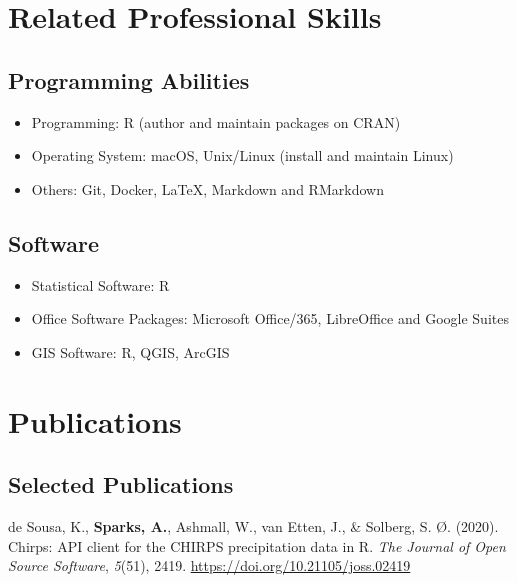 \documentclass[11pt, a4paper]{awesome-cv}
\providecommand{\tightlist}{%
	\setlength{\itemsep}{0pt}\setlength{\parskip}{0pt}}
\begin{document}
\hypertarget{related-professional-skills}{%
\section{Related Professional
Skills}\label{related-professional-skills}}

\hypertarget{programming-abilities}{%
\subsection{Programming Abilities}\label{programming-abilities}}

\begin{itemize}
\tightlist
\item
  Programming: R (author and maintain packages on CRAN)
\item
  Operating System: macOS, Unix/Linux (install and maintain Linux)
\item
  Others: Git, Docker, LaTeX, Markdown and RMarkdown
\end{itemize}

\hypertarget{software}{%
\subsection{Software}\label{software}}

\begin{itemize}
\tightlist
\item
  Statistical Software: R
\item
  Office Software Packages: Microsoft Office/365, LibreOffice and Google
  Suites
\item
  GIS Software: R, QGIS, ArcGIS
\end{itemize}

\hypertarget{publications}{%
\section{Publications}\label{publications}}

\hypertarget{selected-publications}{%
\subsection{Selected Publications}\label{selected-publications}}

\begingroup
\setlength{\parindent}{-0.5in}
\setlength{\leftskip}{0.5in}

\hypertarget{refs_articles}{}
\leavevmode{}%
de Sousa, K., \textbf{Sparks, A.}, Ashmall, W., van Etten, J., \&
Solberg, S. Ø. (2020). Chirps: {API} client for the CHIRPS precipitation
data in {R}. \emph{The Journal of Open Source Software}, \emph{5}(51),
2419. \url{https://doi.org/10.21105/joss.02419}
\end{document}
